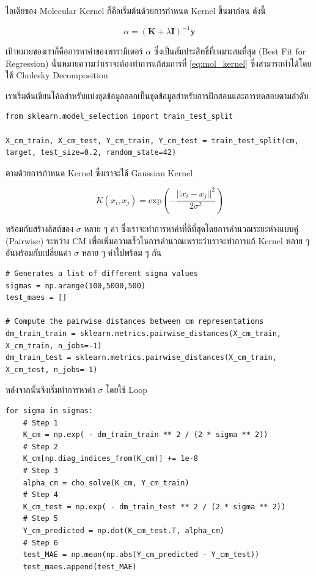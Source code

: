ไอเดียของ Molecular Kernel ก็คือเริ่มต้นด้วยการกำหนด Kernel ขึ้นมาก่อน ดังนี้

\begin{equation}\label{eq:mol_kernel}
    \alpha = (\mathbf{K} + \lambda\mathbf{I} ) ^{-1} \mathbf{y}
\end{equation}

\noindent เป้าหมายของเราก็คือการหาค่าของพารามิเตอร์ $\alpha$ ซึ่งเป็นสัมประสิทธิ์ที่เหมาะสมที่สุด (Best Fit for Regression) 
นั่นหมายความว่าเราจะต้องทำการแก้สมการที่ \ref{eq:mol_kernel} ซึ่งสามารถทำได้โดยใช้ Cholesky Decomposition

เราเริ่มต้นเขียนโค้ดสำหรับแบ่งชุดข้อมูลออกเป็นชุดข้อมูลสำหรับการฝึกสอนและการทดสอบตามลำดับ
\begin{lstlisting}[style=MyPython]
from sklearn.model_selection import train_test_split

X_cm_train, X_cm_test, Y_cm_train, Y_cm_test = train_test_split(cm, target, test_size=0.2, random_state=42)
\end{lstlisting}

\noindent ตามด้วยการกำหนด Kernel ซึ่งเราจะใช้ Gaussian Kernel 

\begin{equation}\label{eq:gaussian_kernel}
    K(x_{i}, x_{j}) = \mathrm{exp}\left( -\frac{||x_i-x_j||^2}{2\sigma^2} \right)
\end{equation}

\noindent พร้อมกับสร้างลิสต์ของ $\sigma$ หลาย ๆ ค่า ซึ่งเราจะทำการหาค่าที่ดีที่สุดโดยการคำนวณระยะห่างแบบคู่ (Pairwise) ระหว่าง CM 
เพื่อเพิ่มความเร็วในการคำนวณเพราะว่าเราจะทำการแก้ Kernel หลาย ๆ อันพร้อมกับเปลี่ยนค่า $\sigma$ หลาย ๆ ค่าไปพร้อม ๆ กัน

\begin{lstlisting}[style=MyPython]
# Generates a list of different sigma values
sigmas = np.arange(100,5000,500) 
test_maes = []

# Compute the pairwise distances between cm representations
dm_train_train = sklearn.metrics.pairwise_distances(X_cm_train, X_cm_train, n_jobs=-1)
dm_train_test = sklearn.metrics.pairwise_distances(X_cm_train, X_cm_test, n_jobs=-1)
\end{lstlisting}

\noindent หลังจากนั้นจึงเริ่มทำการหาค่า $\sigma$ โดยใช้ Loop

\begin{lstlisting}[style=MyPython]
for sigma in sigmas:
    # Step 1
    K_cm = np.exp( - dm_train_train ** 2 / (2 * sigma ** 2)) 
    # Step 2
    K_cm[np.diag_indices_from(K_cm)] += 1e-8
    # Step 3
    alpha_cm = cho_solve(K_cm, Y_cm_train)
    # Step 4
    K_cm_test = np.exp( - dm_train_test ** 2 / (2 * sigma ** 2))
    # Step 5
    Y_cm_predicted = np.dot(K_cm_test.T, alpha_cm)
    # Step 6
    test_MAE = np.mean(np.abs(Y_cm_predicted - Y_cm_test))
    test_maes.append(test_MAE)
\end{lstlisting}

